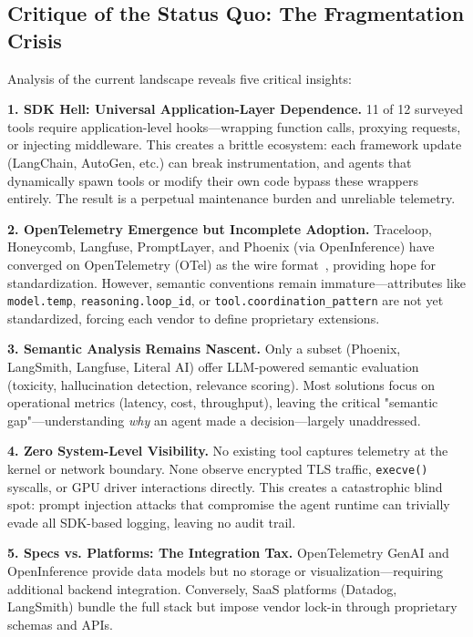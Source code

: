 \documentclass[sigplan,screen,review,9pt]{acmart}
\begin{document}
\subsection{Critique of the Status Quo: The Fragmentation Crisis}

Analysis of the current landscape reveals five critical insights:

\textbf{1. SDK Hell: Universal Application-Layer Dependence.} 11 of 12 surveyed tools require application-level hooks—wrapping function calls, proxying requests, or injecting middleware. This creates a brittle ecosystem: each framework update (LangChain, AutoGen, etc.) can break instrumentation, and agents that dynamically spawn tools or modify their own code bypass these wrappers entirely. The result is a perpetual maintenance burden and unreliable telemetry.

\textbf{2. OpenTelemetry Emergence but Incomplete Adoption.} Traceloop, Honeycomb, Langfuse, PromptLayer, and Phoenix (via OpenInference) have converged on OpenTelemetry (OTel) as the wire format~\cite{Liu2025OTel}, providing hope for standardization. However, semantic conventions remain immature—attributes like \texttt{model.temp}, \texttt{reasoning.loop\_id}, or \texttt{tool.coordination\_pattern} are not yet standardized, forcing each vendor to define proprietary extensions.

\textbf{3. Semantic Analysis Remains Nascent.} Only a subset (Phoenix, LangSmith, Langfuse, Literal AI) offer LLM-powered semantic evaluation (toxicity, hallucination detection, relevance scoring). Most solutions focus on operational metrics (latency, cost, throughput), leaving the critical "semantic gap"—understanding \emph{why} an agent made a decision—largely unaddressed.

\textbf{4. Zero System-Level Visibility.} No existing tool captures telemetry at the kernel or network boundary. None observe encrypted TLS traffic, \texttt{execve()} syscalls, or GPU driver interactions directly. This creates a catastrophic blind spot: prompt injection attacks that compromise the agent runtime can trivially evade all SDK-based logging, leaving no audit trail.

\textbf{5. Specs vs. Platforms: The Integration Tax.} OpenTelemetry GenAI and OpenInference provide data models but no storage or visualization—requiring additional backend integration. Conversely, SaaS platforms (Datadog, LangSmith) bundle the full stack but impose vendor lock-in through proprietary schemas and APIs.
\end{document}
